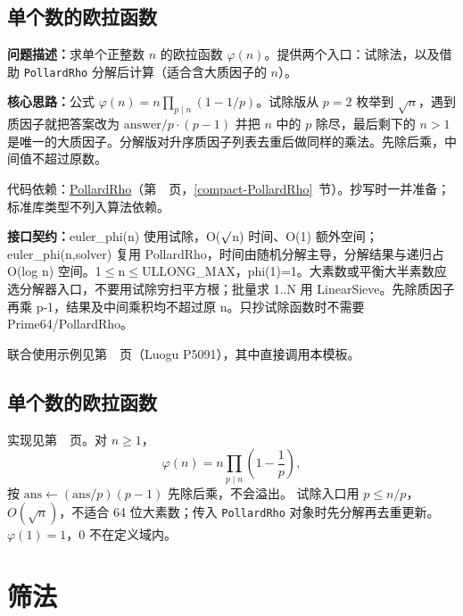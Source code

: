 \subsection{单个数的欧拉函数}\label{compact-euler_phi}

\noindent\textbf{问题描述：}\allowbreak 求单个正整数 $n$ 的欧拉函数 $\varphi(n)$。提供两个入口：试除法，以及借助 \texttt{PollardRho} 分解后计算（适合含大质因子的 $n$）。

\textbf{核心思路：}\allowbreak 公式 $\varphi(n)=n\prod_{p\mid n}(1-1/p)$。试除版从 $p=2$ 枚举到 $\sqrt n$，遇到质因子就把答案改为 $\mathrm{answer}/p\cdot(p-1)$ 并把 $n$ 中的 $p$ 除尽，最后剩下的 $n>1$ 是唯一的大质因子。分解版对升序质因子列表去重后做同样的乘法。先除后乘，中间值不超过原数。

代码依赖：\hyperref[compact-PollardRho]{PollardRho}（第~\pageref{compact-PollardRho}~页，\ref{compact-PollardRho}~节）。抄写时一并准备；标准库类型不列入算法依赖。

{\sloppy{}\noindent\textbf{接口契约：}euler\_phi(n) 使用试除，O($\sqrt{\vphantom x}$n) 时间、O(1) 额外空间；euler\_phi(n,solver) 复用 PollardRho，时间由随机分解主导，分解结果与递归占 O(log n) 空间。1$\le$n$\le$ULLONG\_MAX，phi(1)=1。大素数或平衡大半素数应选分解器入口，不要用试除穷扫平方根；批量求 1..N 用 LinearSieve。先除质因子再乘 p-1，结果及中间乘积均不超过原 n。只抄试除函数时不需要 Prime64/PollardRho。\par}



联合使用示例见第~\pageref{usage-example-106}~页（Luogu P5091），其中直接调用本模板。

\subsection{单个数的欧拉函数}\label{knowledge-phi-single}
实现见第~\pageref{compact-euler_phi}~页。对 $n\ge1$，
\[
\varphi(n)=n\prod_{p\mid n}\left(1-\frac1p\right),
\]
按 $\mathrm{ans}\gets(\mathrm{ans}/p)(p-1)$ 先除后乘，不会溢出。
试除入口用 $p\le n/p$，$O(\sqrt n)$，不适合 64 位大素数；传入 \texttt{PollardRho} 对象时先分解再去重更新。
$\varphi(1)=1$，0 不在定义域内。



\Needspace{424pt}

\section{筛法}

